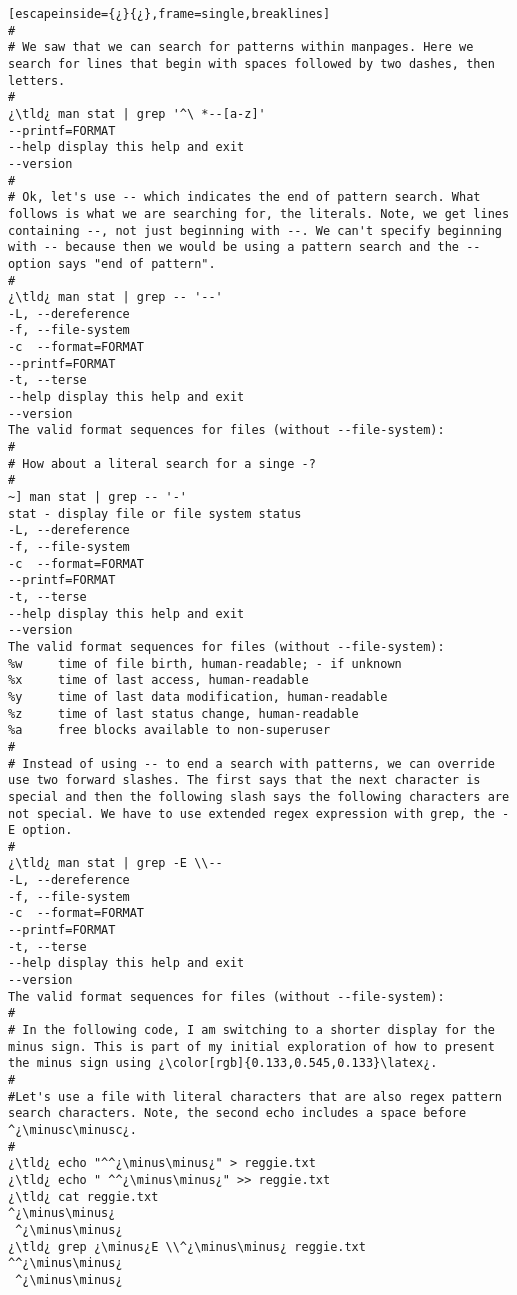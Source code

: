 \begin{lstlisting}[escapeinside={¿}{¿},frame=single,breaklines]
#
# We saw that we can search for patterns within manpages. Here we search for lines that begin with spaces followed by two dashes, then letters.
#
¿\tld¿ man stat | grep '^\ *--[a-z]'
--printf=FORMAT
--help display this help and exit
--version
#
# Ok, let's use -- which indicates the end of pattern search. What follows is what we are searching for, the literals. Note, we get lines containing --, not just beginning with --. We can't specify beginning with -- because then we would be using a pattern search and the -- option says "end of pattern".
#
¿\tld¿ man stat | grep -- '--'
-L, --dereference
-f, --file-system
-c  --format=FORMAT
--printf=FORMAT
-t, --terse
--help display this help and exit
--version
The valid format sequences for files (without --file-system):
#
# How about a literal search for a singe -?
#
~] man stat | grep -- '-'
stat - display file or file system status
-L, --dereference
-f, --file-system
-c  --format=FORMAT
--printf=FORMAT
-t, --terse
--help display this help and exit
--version
The valid format sequences for files (without --file-system):
%w     time of file birth, human-readable; - if unknown
%x     time of last access, human-readable
%y     time of last data modification, human-readable
%z     time of last status change, human-readable
%a     free blocks available to non-superuser
#
# Instead of using -- to end a search with patterns, we can override use two forward slashes. The first says that the next character is special and then the following slash says the following characters are not special. We have to use extended regex expression with grep, the -E option.
#
¿\tld¿ man stat | grep -E \\--
-L, --dereference
-f, --file-system
-c  --format=FORMAT
--printf=FORMAT
-t, --terse
--help display this help and exit
--version
The valid format sequences for files (without --file-system):
#
# In the following code, I am switching to a shorter display for the minus sign. This is part of my initial exploration of how to present the minus sign using ¿\color[rgb]{0.133,0.545,0.133}\latex¿.
# 
#Let's use a file with literal characters that are also regex pattern search characters. Note, the second echo includes a space before ^¿\minusc\minusc¿.
#
¿\tld¿ echo "^^¿\minus\minus¿" > reggie.txt
¿\tld¿ echo " ^^¿\minus\minus¿" >> reggie.txt
¿\tld¿ cat reggie.txt
^¿\minus\minus¿
 ^¿\minus\minus¿
¿\tld¿ grep ¿\minus¿E \\^¿\minus\minus¿ reggie.txt
^^¿\minus\minus¿
 ^¿\minus\minus¿
\end{lstlisting}

